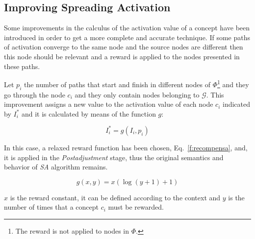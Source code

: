 \subsection{Improving Spreading Activation}\label{improve:sa}
Some improvements in the calculus of the activation value of a
concept have been introduced in order to get a more complete and accurate technique. 
If some paths of activation converge to the same node and the source nodes are different then this node should be 
relevant and a reward is applied to the nodes presented in these paths. 

\begin{definition}
Let $p_i$ the number of paths that start and finish in different nodes of
$\Phi$\footnote{The reward is not applied to nodes in  $\Phi$.} and they go
through the node $c_i$ and they only contain nodes belonging to $\mathcal{G}$.
This improvement assigns a new value to the activation value of each node $c_i$
indicated by $I^*_i$ and it is calculated by means of the function $g$:
\end{definition}

\begin{equation}
I^*_i = g(I_i,p_i)
\end{equation}

In this case, a relaxed reward function has been chosen, Eq.~\ref{f:recompensa},
and, it is applied in the \textit{Postadjustment} stage, thus the
original semantics and behavior of \textit{SA} algorithm remains. 

\begin{equation}\label{f:recompensa}
g(x,y) = x (\log(y+1)+1)
\end{equation}

$x$ is the reward constant, it can be defined according to the context and $y$
is the number of times that a concept $c_i$ must be rewarded.

